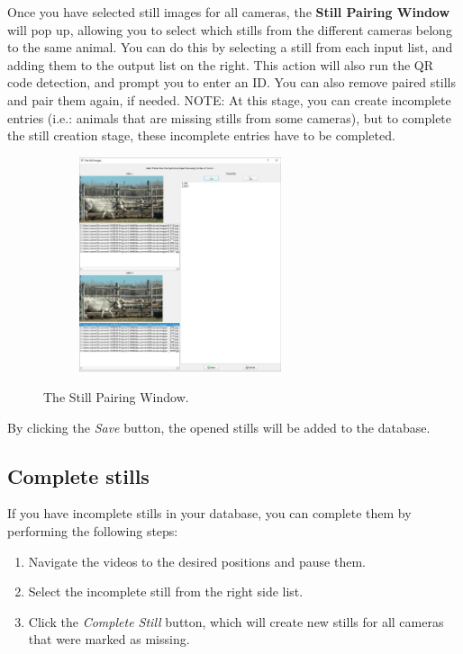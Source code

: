 \documentclass[10pt,a4paper,oneside]{report}             %
\newcommand*{\img}[1]{%
	\raisebox{-.02\baselineskip}{%
		\texttt{[image: \#1]}%
	}%
}
\begin{document}
Once you have selected still images for all cameras, the \textbf{Still Pairing Window} will pop up, allowing you to select which stills from the different cameras belong to the same animal. You can do this by selecting a still from each input list, and adding them to the output list on the right. This action will also run the QR code detection, and prompt you to enter an ID. You can also remove paired stills and pair them again, if needed. NOTE: At this stage, you can create incomplete entries (i.e.: animals that are missing stills from some cameras), but to complete the still creation stage, these incomplete entries have to be completed. 

\begin{figure}[H]
	\centering
	\begin{subfigure}{\textwidth}
		\centering 
		\includegraphics[width=0.65\textwidth]{./images/PairStill.jpg}
	\end{subfigure}
	\caption[]
	{\small  The Still Pairing Window.}
\end{figure} 

By clicking the \textit{Save} \img{../VAM/Icons/1462036176_save_accept.png} button, the opened stills will be added to the database.

\subsection{Complete stills} \label{sec:compStill}

If you have incomplete stills in your database, you can complete them by performing the following steps:
\begin{enumerate}
	\item Navigate the videos to the desired positions  and pause them.
	\item Select the incomplete still from the right side list.
	\item Click the \textit{Complete Still} \img{../VAM/Icons/1462024271_New_image.png} button, which will create new stills for all cameras that were marked as missing.
\end{enumerate}
\end{document}
